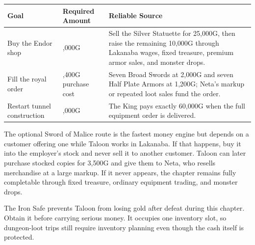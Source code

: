 \documentclass[
  american,
  10pt,
  letterpaper,
  oneside,
  open=any]{scrreprt}
\newcounter{none} %
\newenvironment{guidetable}{%
  \small\setstretch{1.0}%
  \setlength{\tabcolsep}{4pt}%
  \setlength{\LTpre}{8pt}\setlength{\LTpost}{10pt}%
  \renewcommand{\arraystretch}{1.16}%
}{ }
\begin{document}
\begin{guidetable}

{\def\LTcaptype{none} %
\begin{longtable}[]{@{}
  >{\raggedright\arraybackslash}p{}
  >{\raggedleft\arraybackslash}p{}
  >{\raggedright\arraybackslash}p{}@{}}
\toprule\noalign{}
\begin{minipage}[b]{\linewidth}\raggedright
\color{GuideGreen}\bfseries Goal
\end{minipage} & \begin{minipage}[b]{\linewidth}\raggedleft
\color{GuideGreen}\bfseries Required Amount
\end{minipage} & \begin{minipage}[b]{\linewidth}\raggedright
\color{GuideGreen}\bfseries Reliable Source
\end{minipage} \\
\midrule\noalign{}
\endhead
\bottomrule\noalign{}
\endlastfoot
Buy the Endor shop & 35,000G & Sell the Silver Statuette for 25,000G,
then raise the remaining 10,000G through Lakanaba wages, fixed treasure,
premium armor sales, and monster drops. \\
Fill the royal order & 22,400G purchase cost & Seven Broad Swords at
2,000G and seven Half Plate Armors at 1,200G; Neta's markup or repeated
loot sales fund the order. \\
Restart tunnel construction & 60,000G & The King pays exactly 60,000G
when the full equipment order is delivered. \\
\end{longtable}
}

\end{guidetable}

The optional Sword of Malice route is the fastest money engine but
depends on a customer offering one while Taloon works in Lakanaba. If
that happens, buy it into the employer's stock and never sell it to
another customer. Taloon can later purchase stocked copies for 3,500G
and give them to Neta, who resells merchandise at a large markup. If it
never appears, the chapter remains fully completable through fixed
treasure, ordinary equipment trading, and monster drops.

The Iron Safe prevents Taloon from losing gold after defeat during this
chapter. Obtain it before carrying serious money. It occupies one
inventory slot, so dungeon-loot trips still require inventory planning
even though the cash itself is protected.
\end{document}
